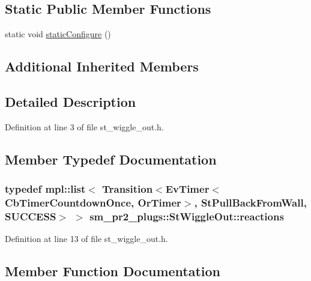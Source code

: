 \subsection*{Static Public Member Functions}
\begin{DoxyCompactItemize}
\item 
static void \hyperlink{structsm__pr2__plugs_1_1StWiggleOut_ad4db8d9b75e1fd0fb6641666d0b10554}{static\+Configure} ()
\end{DoxyCompactItemize}
\subsection*{Additional Inherited Members}


\subsection{Detailed Description}


Definition at line 3 of file st\+\_\+wiggle\+\_\+out.\+h.



\subsection{Member Typedef Documentation}
\subsubsection[{\texorpdfstring{reactions}{reactions}}]{\setlength{\rightskip}{0pt plus 5cm}typedef mpl\+::list$<$ Transition$<$Ev\+Timer$<$Cb\+Timer\+Countdown\+Once, {\bf Or\+Timer}$>$, {\bf St\+Pull\+Back\+From\+Wall}, {\bf S\+U\+C\+C\+E\+SS}$>$ $>$ {\bf sm\+\_\+pr2\+\_\+plugs\+::\+St\+Wiggle\+Out\+::reactions}}\hypertarget{structsm__pr2__plugs_1_1StWiggleOut_a7984b3c4a0d48be520994c08bb97d328}{}\label{structsm__pr2__plugs_1_1StWiggleOut_a7984b3c4a0d48be520994c08bb97d328}


Definition at line 13 of file st\+\_\+wiggle\+\_\+out.\+h.



\subsection{Member Function Documentation}
